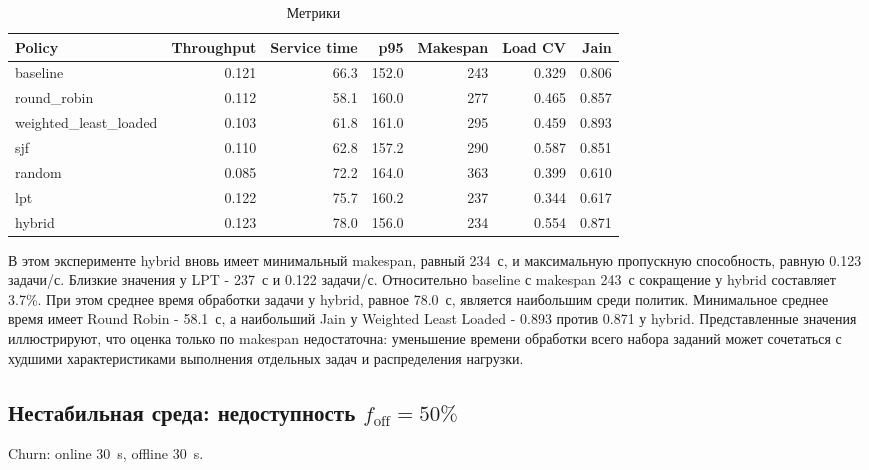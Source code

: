 \documentclass[a4paper,12pt]{extarticle}
\begin{document}
\begin{table}[H]
    \centering
    \caption{Метрики}
\footnotesize
\begin{tabular}{lrrrrrr}
\toprule
Policy & Throughput & Service time & p95 & Makespan & Load CV & Jain \\
\midrule
    baseline & 0.121 & 66.3 & 152.0 & 243 & 0.329 & 0.806 \\
    round\_robin & 0.112 & 58.1 & 160.0 & 277 & 0.465 & 0.857 \\
    weighted\_least\_loaded & 0.103 & 61.8 & 161.0 & 295 & 0.459 & 0.893 \\
    sjf & 0.110 & 62.8 & 157.2 & 290 & 0.587 & 0.851 \\
    random & 0.085 & 72.2 & 164.0 & 363 & 0.399 & 0.610 \\
    lpt & 0.122 & 75.7 & 160.2 & 237 & 0.344 & 0.617 \\
    hybrid & 0.123 & 78.0 & 156.0 & 234 & 0.554 & 0.871 \\
\bottomrule
\end{tabular}
\end{table}

В этом эксперименте hybrid вновь имеет минимальный makespan, равный 234~с, и максимальную пропускную способность, равную 0.123 задачи/с. Близкие значения у LPT - 237~с и 0.122 задачи/с. Относительно baseline с makespan 243~с сокращение у hybrid составляет 3.7\%. При этом среднее время обработки задачи у hybrid, равное 78.0~с, является наибольшим среди политик. Минимальное среднее время имеет Round Robin - 58.1~с, а наибольший Jain у Weighted Least Loaded - 0.893 против 0.871 у hybrid. Представленные значения иллюстрируют, что оценка только по makespan недостаточна: уменьшение времени обработки всего набора заданий может сочетаться с худшими характеристиками выполнения отдельных задач и распределения нагрузки.

\subsection{Нестабильная среда: недоступность $f_{\text{off}}=50\%$}
Churn: online 30~s, offline 30~s.
\end{document}
